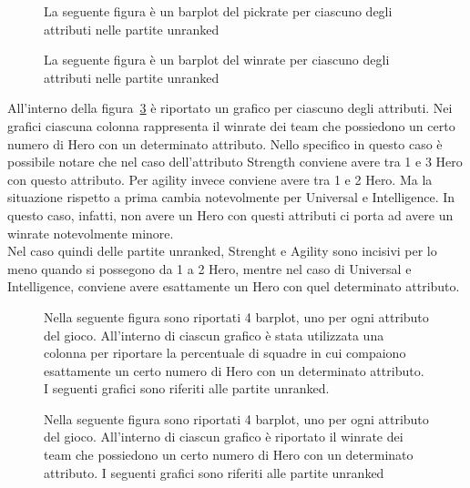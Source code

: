 \begin{figure}[htbp]
\centering
\begin{multicols}{2}
\hspace*{-0.2\linewidth}

\caption{La seguente figura è un barplot del pickrate per ciascuno degli attributi nelle partite unranked}
\label{pickrate_attributi_unranked}
\hspace*{-0.1\linewidth}

\caption{La seguente figura è un barplot del winrate per ciascuno degli attributi nelle partite unranked}
\label{winrate_attributi_unranked}
\end{multicols}
\end{figure}
All'interno della figura~\ref{winrate_attributi_merged_unranked} è riportato un grafico per ciascuno degli attributi.  Nei grafici ciascuna colonna rappresenta il winrate dei team che possiedono un certo numero di Hero con un determinato attributo. Nello specifico in questo caso è possibile notare che nel caso dell'attributo Strength conviene avere tra 1 e 3 Hero con questo attributo. Per agility invece conviene avere tra 1 e 2 Hero. Ma la situazione rispetto a prima cambia notevolmente per Universal e Intelligence. In questo caso, infatti, non avere un Hero con questi attributi ci porta ad avere un winrate notevolmente minore. \\
Nel caso quindi delle partite unranked, Strenght e Agility sono incisivi per lo meno quando si possegono da 1 a 2 Hero, mentre nel caso di Universal e Intelligence, conviene avere esattamente un Hero con quel determinato attributo. \\ 
\begin{figure}[htbp]
\begin{center}

\caption{Nella seguente figura sono riportati 4 barplot, uno per ogni attributo del gioco. All'interno di ciascun grafico è stata utilizzata una colonna per riportare la percentuale di squadre in cui compaiono esattamente un certo numero di Hero con un determinato attributo. I seguenti grafici sono riferiti alle partite unranked.}
\label{pickrate_attributi_merged_unranked}
\end{center}
\end{figure}
\begin{figure}[htbp]
\begin{center}

\caption{Nella seguente figura sono riportati 4 barplot, uno per ogni attributo del gioco. All'interno di ciascun grafico è riportato il winrate dei team che possiedono un certo numero di Hero con un determinato attributo. I seguenti grafici sono riferiti alle partite unranked}
\label{winrate_attributi_merged_unranked}
\end{center}
\end{figure}
